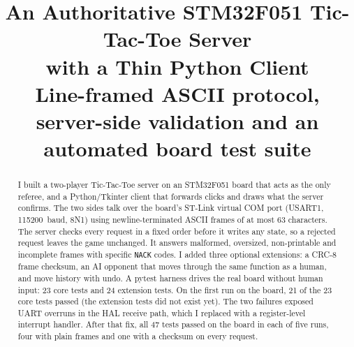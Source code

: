 \documentclass[conference]{IEEEtran}
\renewcommand{\_}{\textunderscore\penalty0\hskip0pt\relax}
\begin{document}
\title{An Authoritative STM32F051 Tic-Tac-Toe Server\\with a Thin Python Client\\[2pt]
\normalsize Line-framed ASCII protocol, server-side validation and an automated board test suite}

\author{
}

\maketitle

\begin{abstract}
I built a two-player Tic-Tac-Toe server on an STM32F051 board that acts as the
only referee, and a Python/Tkinter client that forwards clicks and draws what
the server confirms. The two sides talk over the board's ST-Link virtual COM
port (USART1, 115200~baud, 8N1) using newline-terminated ASCII frames of at
most 63 characters. The server checks every request in a fixed order before it
writes any state, so a rejected request leaves the game unchanged. It answers
malformed, oversized, non-printable and incomplete frames with specific
\texttt{NACK} codes. I added three optional extensions: a CRC-8 frame
checksum, an AI opponent that moves through the same function as a human, and
move history with undo. A pytest harness drives the real board without human
input: 23 core tests and 24 extension tests. On the first run on the board,
21 of the 23 core tests passed (the extension tests did not exist yet). The two
failures exposed UART overruns in the HAL receive path, which I replaced with
a register-level interrupt handler. After that fix, all 47 tests passed on the
board in each of five runs, four with plain frames and one with a checksum on
every request.
\end{abstract}
\end{document}
